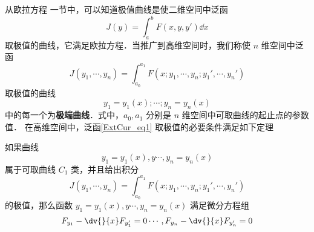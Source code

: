 

从欧拉方程 一节中，可以知道极值曲线是使二维空间中泛函 
\begin{equation}
J(y)=\int_a^b F(x,y,y')\dd x
\end{equation}
取极值的曲线，它满足欧拉方程．当推广到高维空间时，我们称使 $n$ 维空间中泛函 
\begin{equation}\label{ExtCur_eq1}
J(y_1,\cdots, y_n)=\int_{a_0}^{a_1}F(x;y_1,\cdots,y_n;y_1',\cdots,y_n') 
\end{equation}
取极值的曲线 
\begin{equation}
y_1=y_1(x);\cdots;y_n=y_n(x)
\end{equation}
中的每一个为\textbf{极端曲线}．式中，$a_0,a_1$ 分别是 $n$ 维空间中可取曲线的起止点的参数值． 
在高维空间中，泛函\autoref{ExtCur_eq1} 取极值的必要条件满足如下定理
\begin{theorem}{}
如果曲线 
\begin{equation}
y_1=y_1(x),y\cdots,y_n=y_n(x)
\end{equation}
属于可取曲线 $C_1$ 类，并且给出积分 
\begin{equation}
J(y_1,\cdots, y_n)=\int_{a_0}^{a_1}F(x;y_1,\cdots,y_n;y_1',\cdots,y_n') 
\end{equation}
 的极值，那么函数 $y_1=y_1(x),y\cdots,y_n=y_n(x)$ 满足微分方程组
\begin{equation}
F_{y_1}-\dv{}{x}F_{y_1'}=0\cdots,F_{y_n}-\dv{}{x}F_{y_n'}=0
\end{equation}

\end{theorem}
